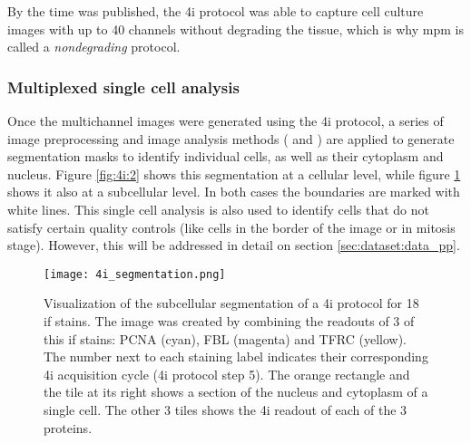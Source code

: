 By the time \cite{Guteaar7042} was published, the \gls{4i} protocol was able to capture cell culture images with up to 40 channels without degrading the tissue, which is why \gls{mpm} is called a \textit{nondegrading} protocol.

\subsubsection{Multiplexed single cell analysis}

Once the multichannel images were generated using the \gls{4i} protocol, a series of image preprocessing and image analysis methods (\cite{Carpenter2006} and \cite{snijder2012single}) are applied to generate segmentation masks to identify individual cells, as well as their cytoplasm and nucleus. Figure \ref{fig:4i:2} shows this segmentation at a cellular level, while figure \ref{fig:4i:segmentation} shows it also at a subcellular level. In both cases the boundaries are marked with white lines. This single cell analysis is also used to identify cells that do not satisfy certain quality controls (like cells in the border of the image or in mitosis stage). However, this will be addressed in detail on section \ref{sec:dataset:data_pp}.

\begin{figure}[htb]
  \centering
  \texttt{[image: 4i\_segmentation.png]}
  \caption{Visualization of the subcellular segmentation of a \gls{4i} protocol for 18 \gls{if} stains. The image was created by combining the readouts of 3 of this \gls{if} stains: PCNA (cyan), FBL (magenta) and TFRC (yellow). The number next to each staining label indicates their corresponding 4i acquisition cycle (\gls{4i} protocol step 5). The orange rectangle and the tile at its right shows a section of the nucleus and cytoplasm of a single cell. The other 3 tiles shows the \gls{4i} readout of each of the 3 proteins.}
  \label{fig:4i:segmentation}
\end{figure}

